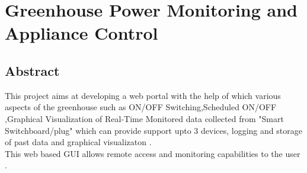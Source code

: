 \documentclass[a4paper,12pt,oneside]{book}
\begin{document}
\tableofcontents
\chapter[GREENHOUSE POWER MONITORING AND APPLIANCE CONTROL]{Greenhouse Power Monitoring and Appliance Control }
\section{Abstract}
\hspace{7mm}This project aims at developing a web portal with the help of which various aspects of the greenhouse such as ON/OFF Switching,Scheduled ON/OFF ,Graphical Visualization of Real-Time Monitored data collected from "Smart Switchboard/plug" which can provide support upto 3 devices, logging and storage of past data and graphical visualizaton .\\

This web based GUI allows remote access and monitoring capabilities to the user .\\

\newpage
\end{document}
